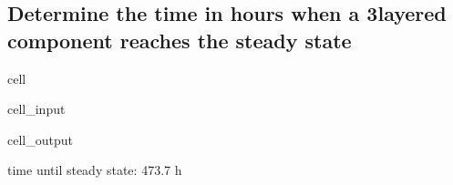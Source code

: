 \documentclass[letterpaper,10pt,english]{jupyterBook}
\begin{document}
\subsection{Determine the time in hours when a 3\sphinxhyphen{}layered component reaches the steady state}
\label{\detokenize{Aufgabe1:determine-the-time-in-hours-when-a-3-layered-component-reaches-the-steady-state}}
\begin{sphinxuseclass}{cell}\begin{sphinxVerbatimInput}

\begin{sphinxuseclass}{cell_input}
\begin{sphinxVerbatim}[commandchars=\\\{\}]
    
\end{sphinxVerbatim}

\end{sphinxuseclass}\end{sphinxVerbatimInput}
\begin{sphinxVerbatimOutput}

\begin{sphinxuseclass}{cell_output}
\begin{sphinxVerbatim}[commandchars=\\\{\}]
time until steady state: 473.7 h
\end{sphinxVerbatim}

\end{sphinxuseclass}\end{sphinxVerbatimOutput}

\end{sphinxuseclass}
\end{document}
